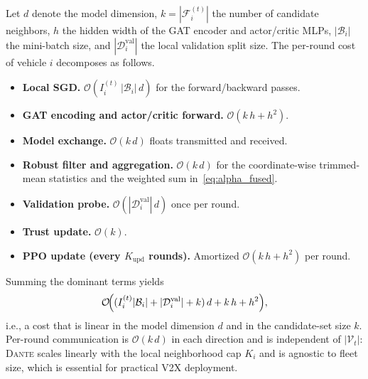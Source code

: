 Let $d$ denote the model dimension, $k=|\mathcal{F}_i^{(t)}|$ the number of candidate neighbors, $h$ the hidden width of the GAT encoder and actor/critic MLPs, $|\mathcal{B}_i|$ the mini-batch size, and $|\mathcal{D}_i^{\mathrm{val}}|$ the local validation split size. The per-round cost of vehicle $i$ decomposes as follows.
\begin{itemize}
    \item \textbf{Local SGD.} $\mathcal{O}(I_i^{(t)}\,|\mathcal{B}_i|\,d)$ for the forward/backward passes.
    \item \textbf{GAT encoding and actor/critic forward.} $\mathcal{O}(k\,h + h^2)$.
    \item \textbf{Model exchange.} $\mathcal{O}(k\,d)$ floats transmitted and received.
    \item \textbf{Robust filter and aggregation.} $\mathcal{O}(k\,d)$ for the coordinate-wise trimmed-mean statistics and the weighted sum in~\eqref{eq:alpha_fused}.
    \item \textbf{Validation probe.} $\mathcal{O}(|\mathcal{D}_i^{\mathrm{val}}|\,d)$ once per round.
    \item \textbf{Trust update.} $\mathcal{O}(k)$.
    \item \textbf{PPO update (every $K_{\mathrm{upd}}$ rounds).} Amortized $\mathcal{O}(k\,h+h^2)$ per round.
\end{itemize}
Summing the dominant terms yields
\begin{equation*}
    \mathcal{O}\!\Bigl((I_i^{(t)}|\mathcal{B}_i|+|\mathcal{D}_i^{\mathrm{val}}|+k)\,d + k\,h + h^2\Bigr),
\end{equation*}
i.e., a cost that is linear in the model dimension $d$ and in the candidate-set size $k$. Per-round communication is $\mathcal{O}(k\,d)$ in each direction and is independent of $|\mathcal{V}_t|$: \textsc{Dante} scales linearly with the local neighborhood cap $K_i$ and is agnostic to fleet size, which is essential for practical V2X deployment.
